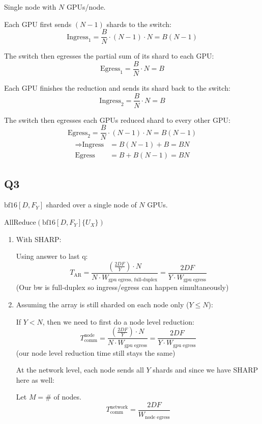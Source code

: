 \documentclass[11pt]{article}
\newcommand{\Tcomm}{T_{\text{comm}}}
\begin{document}
Single node with $N$ GPUs/node.

Each GPU first sends $(N-1)$ shards to the switch:
\[
\text{Ingress}_1 = \frac{B}{N} \cdot (N-1) \cdot N = B(N-1)
\]

The switch then egresses the partial sum of its shard to each GPU:
\[
\text{Egress}_1 = \frac{B}{N} \cdot N = B
\]

Each GPU finishes the reduction and sends its shard back to the switch:
\[
\text{Ingress}_2 = \frac{B}{N} \cdot N = B
\]

The switch then egresses each GPUs reduced shard to every other GPU:
\[
\text{Egress}_2 = \frac{B}{N} \cdot (N-1) \cdot N = B(N-1)
\]
\begin{align*}
\Rightarrow \text{Ingress} &= B(N-1) + B = BN \\
\text{Egress} &= B + B(N-1) = BN
\end{align*}

\subsection*{Q3}

$\text{bf16}[D, F_Y]$ sharded over a single node of $N$ GPUs.

AllReduce$(\text{bf16}[D, F_Y]\{U_X\})$

\begin{enumerate}[label=(\roman*)]
    \item With SHARP:

    Using answer to last q:
    \[
    T_{\text{AR}} = \frac{\left(\frac{2DF}{Y}\right) \cdot N}{N \cdot W_{\text{gpu egress, full-duplex}}} = \frac{2DF}{Y \cdot W_{\text{gpu egress}}}
    \]
    (Our bw is full-duplex so ingress/egress can happen simultaneously)

    \item Assuming the array is still sharded on each node only ($Y \leq N$):

    If $Y < N$, then we need to first do a node level reduction:
    \[
    \Tcomm^{\text{node}} = \frac{\left(\frac{2DF}{Y}\right) \cdot N}{N \cdot W_{\text{gpu egress}}} = \frac{2DF}{Y \cdot W_{\text{gpu egress}}}
    \]
    (our node level reduction time still stays the same)

    At the network level, each node sends all $Y$ shards and since we have SHARP here as well:

    Let $M = \#$ of nodes.
    \[
    \Tcomm^{\text{network}} = \frac{2DF}{W_{\text{node egress}}}
    \]
\end{enumerate}
\end{document}
